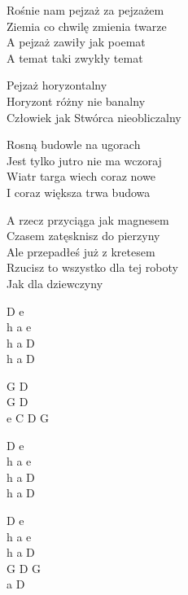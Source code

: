 \begin{text}
    Rośnie nam pejzaż za pejzażem\\
    Ziemia co chwilę zmienia twarze\\
    A pejzaż zawiły jak poemat\\
    A temat taki zwykły temat

    \vin Pejzaż horyzontalny\\
    \vin Horyzont różny nie banalny\\
    \vin Człowiek jak Stwórca nieobliczalny

    Rosną budowle na ugorach\\
    Jest tylko jutro nie ma wczoraj\\
    Wiatr targa wiech coraz nowe\\
    I coraz większa trwa budowa

    A rzecz przyciąga jak magnesem\\
    Czasem zatęsknisz do pierzyny\\
    Ale przepadłeś już z kretesem\\
    Rzucisz to wszystko dla tej roboty\\
    Jak dla dziewczyny
\end{text}
\begin{chord}
    D e\\
    h a e\\
    h a D\\
    h a D

    G D\\
    G D\\
    e C D G

    D e\\
    h a e\\
    h a D\\
    h a D

    D e\\
    h a e\\
    h a D\\
    G D G\\
    a D
\end{chord}